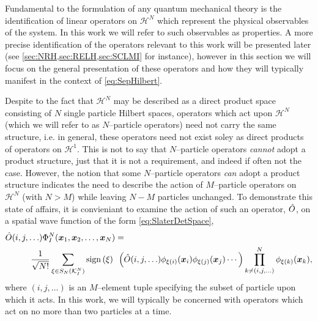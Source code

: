 Fundamental to the formulation of any quantum mechanical theory is the identification of linear operators on $\mathcal{H}^N$
which represent the physical observables of the system. In this work we will refer to such observables as properties. A
more precise identification of the operators relevant to this work will be presented later 
(see \cref{sec:NRH,sec:RELH,sec:SCLMI} for instance), however in this section we will focus on the general presentation
of these operators and how they will typically manifest in the context of \cref{eq:SepHilbert}. 

Despite to the fact that $\mathcal{H}^N$ may be described as a direct product space consisting of $N$ single particle
Hilbert spaces, operators which act upon $\mathcal{H}^N$ (which we will refer to as $N$--particle operators) need not carry the same structure, 
i.e. in general, these operators need not exist soley as direct products of operators on $\mathcal{H}^1$. This is not to say
that $N$--particle operators \emph{cannot} adopt a product structure, just that it is not a requirement, and indeed
if often not the case. However, the notion that some $N$--particle operators \emph{can} adopt a product structure indicates the need
to describe the action of $M$--particle operators on $\mathcal{H}^N$ (with $N>M$) while leaving $N-M$ particles unchanged.
To demonstrate this state of affairs, it is convieniant to examine the action of such an operator, $\hat{O}$, on a 
spatial wave function of the form \cref{eq:SlaterDetSpace},
\begin{align}
  \label{eq:MOpSpace}
  &\hat{O}(i,j,\ldots) \Phi_I^N(\boldsymbol{x}_1,\boldsymbol{x}_2,\ldots,\boldsymbol{x}_N) = \nonumber \\ &\qquad \quad
    \frac{1}{\sqrt{N!}} \sum_{\xi \in S_N(\mathcal{K}^N_I)} \mathrm{sign}\left( \xi \right) \text{ } 
    \left(\hat{O}(i,j,\ldots) \phi_{\xi(i)}(\boldsymbol{x}_i)\phi_{\xi(j)}(\boldsymbol{x}_j)\cdots\right)
    \prod_{k \neq (i,j,\ldots) }^{N} \phi_{\xi(k)}(\boldsymbol{x}_k),
\end{align}
where $(i,j,\ldots)$ is an $M$--element tuple specifying the subset of particle upon which it acts.
In this work, we will typically be concerned with operators which act on no more than two particles at a time.

